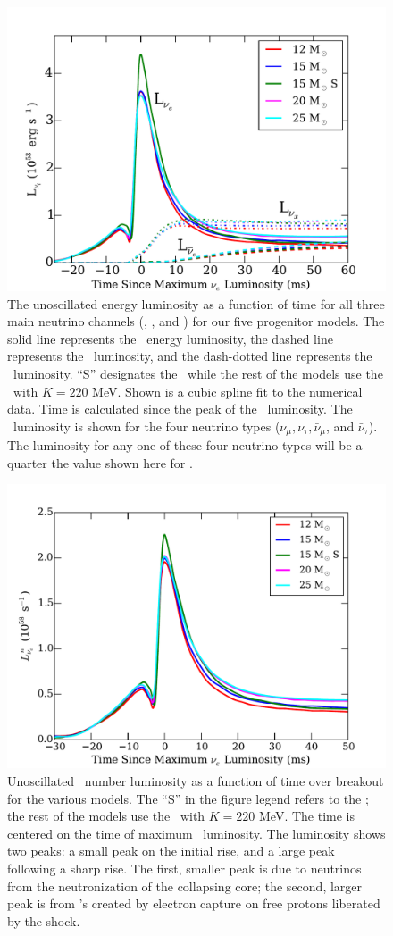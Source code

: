 \begin{figure}[h]
\centering
\includegraphics[width=0.7\linewidth]{lum_func_time_outer_radius.pdf}
\caption{\label{fig:lumallt}The unoscillated 
energy luminosity as a function of time for all
three main neutrino channels (\nue, \anue, and \nux) for our five
progenitor 
models.  The solid line represents the \nue\ energy luminosity, the
dashed line represents the \anue\ luminosity, and the dash-dotted line
represents the \nux\ luminosity.  ``S'' designates the \shen\ while
the rest of the models use the \ls\ with $K=220$ MeV. 
Shown is a cubic spline fit to the numerical
data. Time is calculated since the peak of
the \nue\ luminosity.  The \nux\ luminosity is shown for the four
neutrino types ($\nu_\mu,\nu_\tau,\bar\nu_\mu$, and
$\bar\nu_\tau$). The luminosity for any one of these four
neutrino types
will be a quarter the value shown here for \nux.}
\end{figure}

\begin{figure}[h]
\centering
\includegraphics[width=0.75\linewidth]{nue_lum_func_time_all.pdf}
\caption{\label{fig:nuelumt} 
Unoscillated \nue\ number luminosity as a
function of time over breakout for the various models. 
The ``S'' in the figure legend
refers to the \shen; the rest of the models use the \ls\ with $K=220$ MeV.  
The time is centered on the
time of maximum \nue\ luminosity.   The luminosity shows 
two peaks: a small peak on the
initial rise, and a large peak following a sharp rise.  The first,
smaller peak is due to neutrinos from the neutronization of
the collapsing core; the second, larger peak is from \nue's created by
electron capture on free protons liberated by the 
shock. }
\end{figure}

